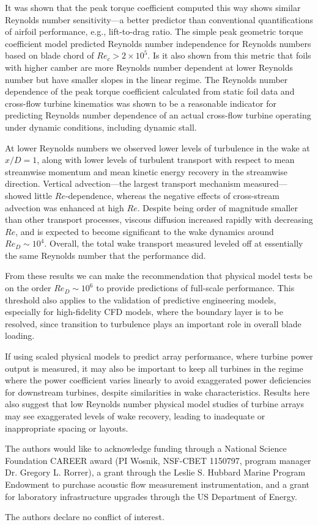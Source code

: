 \documentclass[energies,article,accept,moreauthors,pdftex,12pt,a4paper]{mdpi}
\begin{document}
It was shown that the peak torque coefficient computed this way shows similar
Reynolds number sensitivity---a better predictor than conventional
quantifications of airfoil performance, e.g., lift-to-drag ratio. The simple
peak geometric torque coefficient model predicted Reynolds number independence
for Reynolds numbers based on blade chord of $Re_c > 2 \times 10^5$. Is it also
shown from this metric that foils with higher camber are more Reynolds number
dependent at lower Reynolds number but have smaller slopes in the linear regime.
The Reynolds number dependence of the peak torque coefficient calculated from
static foil data and cross-flow turbine kinematics was shown to be a reasonable
indicator for predicting Reynolds number dependence of an actual cross-flow
turbine operating under dynamic conditions, including dynamic stall.

At lower Reynolds numbers we observed lower levels of turbulence in the wake at
$x/D=1$, along with lower levels of turbulent transport with respect to mean
streamwise momentum and mean kinetic energy recovery in the streamwise
direction. Vertical advection---the largest transport mechanism
measured---showed little $Re$-dependence, whereas the negative effects of
cross-stream advection was enhanced at high $Re$. Despite being order of
magnitude smaller than other transport processes, viscous diffusion increased
rapidly with decreasing $Re$, and is expected to become significant to the wake
dynamics around $Re_D \sim 10^4$. Overall, the total wake transport measured
leveled off at essentially the same Reynolds number that the performance did.

From these results we can make the recommendation that physical model tests be
on the order $Re_D \sim 10^6$ to provide predictions of full-scale performance.
This threshold also applies to the validation of predictive engineering models,
especially for high-fidelity CFD models, where the boundary layer is to be
resolved, since transition to turbulence plays an important role in overall
blade loading.

If using scaled physical models to predict array performance, where turbine
power output is measured, it may also be important to keep all turbines in the
regime where the power coefficient varies linearly to avoid exaggerated power
deficiencies for downstream turbines, despite similarities in wake
characteristics. Results here also suggest that low Reynolds number physical
model studies of turbine arrays may see exaggerated levels of wake recovery,
leading to inadequate or inappropriate spacing or layouts.



The authors would like to acknowledge funding through a National Science
Foundation CAREER award (PI Wosnik, NSF-CBET 1150797, program manager Dr. 
Gregory L. Rorrer), a grant through the Leslie S. Hubbard Marine Program 
Endowment to
purchase acoustic flow measurement instrumentation, and a grant for laboratory
infrastructure upgrades through the US Department of Energy.


The authors declare no conflict of interest.




\end{document}
